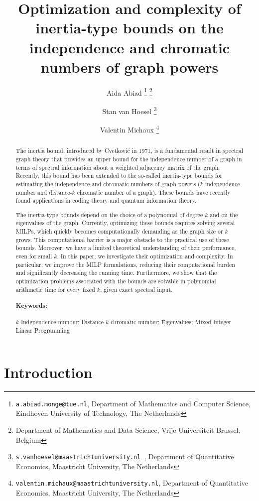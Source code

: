 \documentclass[10pt]{article}
\title{Optimization and complexity of inertia-type bounds on the independence and chromatic numbers of graph powers}
\author{
Aida Abiad
\thanks{\texttt{a.abiad.monge@tue.nl}, Department of Mathematics and Computer Science, Eindhoven University of Technology, The Netherlands}
\thanks{Department of Mathematics and Data Science, Vrije Universiteit Brussel, Belgium} 
\and
Stan van Hoesel \thanks{\texttt{s.vanhoesel@maastrichtuniversity.nl }, Department of Quantitative Economics, Maastricht University, The Netherlands} 
\and
Valentin Michaux
\thanks{\texttt{valentin.michaux@maastrichtuniversity.nl}, Department of Quantitative Economics, Maastricht University, The Netherlands} 
}
\date{}
\begin{document}
\maketitle


\begin{abstract}
The inertia bound, introduced by Cvetkovi\'c in 1971, is a fundamental result in spectral graph theory that provides an upper bound for the independence number of a graph in terms of spectral information about a weighted adjacency matrix of the graph. Recently, this bound has been extended to the so-called inertia-type bounds for estimating the independence and chromatic numbers of graph powers ($k$-independence number and distance-$k$ chromatic number of a graph). These bounds have recently found applications in coding theory and quantum information theory.

The inertia-type bounds depend on the choice of a polynomial of degree $k$ and on the eigenvalues of the graph. Currently, optimizing these bounds requires solving several MILPs, which quickly becomes computationally demanding as the graph size or $k$ grows. This computational barrier is a major obstacle to the practical use of these bounds. Moreover, we have a limited theoretical understanding of their performance, even for small $k$. In this paper, we investigate their optimization and complexity. In particular, we improve the MILP formulations, reducing their computational burden and significantly decreasing the running time. Furthermore, we show that the optimization problems associated with the bounds are solvable in polynomial arithmetic time for every fixed $k$, given exact spectral input.

\paragraph{Keywords:} $k$-Independence number; Distance-$k$ chromatic number; Eigenvalues; Mixed Integer Linear Programming



\end{abstract}



\section{Introduction}
\end{document}
